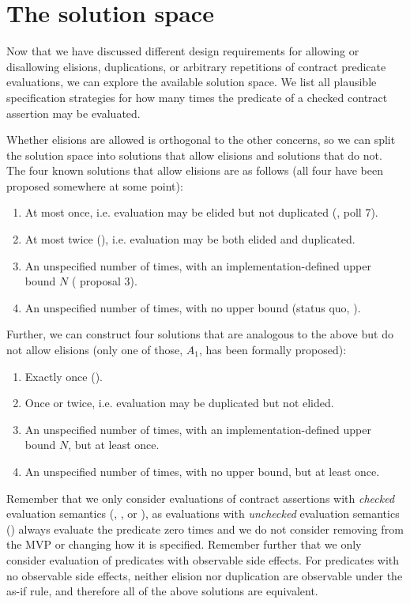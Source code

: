 
\section{The solution space}
\label{sec:prepost}

Now that we have discussed different design requirements for allowing or disallowing elisions, duplications, or arbitrary repetitions of contract predicate evaluations, we can explore the available solution space. We list all plausible specification strategies for how many times the predicate of a checked contract assertion may be evaluated.

Whether elisions are allowed is orthogonal to the other concerns, so we can split the solution space into solutions that allow elisions and solutions that do not. The four known solutions that allow elisions are as follows (all four have been proposed somewhere at some point):

\renewcommand{\theenumi}{$\Alph{enumi}_0$} \begin{enumerate}
\item At most once, i.e. evaluation may be elided but not duplicated (\cite{P1670R0}, \cite{D3197R0} poll 7).
\item At most twice (\cite{P2521R5}), i.e. evaluation may be both elided and duplicated.
\item An unspecified number of times, with an implementation-defined upper bound $N$ (\cite{P3119R0} proposal 3).
\item An unspecified number of times, with no upper bound (status quo, \cite{P2900R6}).
\end{enumerate}
Further, we can construct four solutions that are analogous to the above but do not allow elisions (only one of those, $A_1$, has been formally proposed):
\renewcommand{\theenumi}{$\Alph{enumi}_1$} \begin{enumerate}
\item Exactly once (\cite{P2756R0}).
\item Once or twice, i.e. evaluation may be duplicated but not elided.
\item An unspecified number of times, with an implementation-defined upper bound $N$, but at least once.
\item An unspecified number of times, with no upper bound, but at least once.
\end{enumerate}

 Remember that we only consider evaluations of contract assertions with \emph{checked} evaluation semantics (, , or ), as evaluations with \emph{unchecked} evaluation semantics () always evaluate the predicate zero times and we do not consider removing  from the MVP or changing how it is specified. Remember further that we only consider evaluation of predicates with observable side effects. For predicates with no observable side effects, neither elision nor duplication are observable under the as-if rule, and therefore all of the above solutions are equivalent. 

